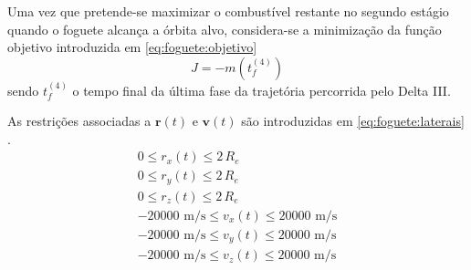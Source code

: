 
Uma vez que pretende-se maximizar o combustível restante no segundo estágio quando o foguete alcança a órbita alvo, considera-se a minimização da função objetivo introduzida em \eqref{eq:foguete:objetivo}
%
\begin{equation}
	\label{eq:foguete:objetivo}
	J = -m(t_f^{(4)})
\end{equation}
%
sendo $ t_f^{(4)} $ o tempo final da última fase da trajetória percorrida pelo Delta III. 


As restrições associadas a $ \mathbf{r}(t) $ e $ \mathbf{v}(t) $ são introduzidas em \eqref{eq:foguete:laterais} \cite{becerra_psopt_2019}. 
%
\begin{equation}
	\label{eq:foguete:laterais}
	\begin{gathered}
		0 \leq r_x(t) \leq 2 \, R_e \\
		0 \leq r_y(t) \leq 2 \, R_e \\
		0 \leq r_z(t) \leq 2 \, R_e \\
		-20000 \text{ m/s} \leq v_x(t) \leq 20000 \text{ m/s}\\
		-20000 \text{ m/s} \leq v_y(t) \leq 20000 \text{ m/s}\\
		-20000 \text{ m/s} \leq v_z(t) \leq 20000 \text{ m/s}
	\end{gathered}
\end{equation}

